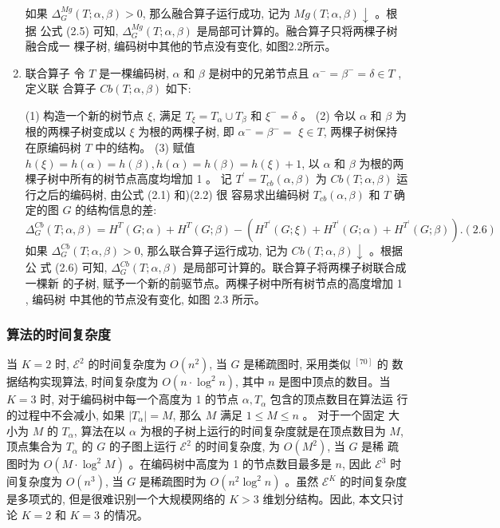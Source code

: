 \documentclass[a4paper]{apa6}
\begin{document}
\begin{enumerate}
如果 \(\Delta_{G}^{M g}(T ; \alpha, \beta)>0\), 那么融合算子运行成功, 记为 \(M g(T ; \alpha, \beta) \downarrow\) 。根据 公式 (2.5) 可知, \(\Delta_{G}^{M g}(T ; \alpha, \beta)\) 是局部可计算的。融合算子只将两棵子树融合成一 棵子树, 编码树中其他的节点没有变化, 如图2.2所示。

\item 联合算子
\label{sec:org2361be5}
令 \(T\) 是一棵编码树, \(\alpha\) 和 \(\beta\) 是树中的兄弟节点且 \(\alpha^{-}=\beta^{-}=\delta \in T\) , 定义联 合算子 \(C b(T ; \alpha, \beta)\) 如下:

(1) 构造一个新的树节点 \(\xi\), 满足 \(T_{\xi}=T_{\alpha} \cup T_{\beta}\) 和 \(\xi^{-}=\delta\) 。
(2) 令以 \(\alpha\) 和 \(\beta\) 为根的两棵子树变成以 \(\xi\) 为根的两棵子树, 即 \(\alpha^{-}=\beta^{-}=\) \(\xi \in T\), 两棵子树保持在原编码树 \(T\) 中的结构。
(3) 赋值 \(h(\xi)=h(\alpha)=h(\beta), h(\alpha)=h(\beta)=h(\xi)+1\), 以 \(\alpha\) 和 \(\beta\) 为根的两 棵子树中所有的树节点高度均增加 1 。
记 \(T^{\prime}=T_{c b}(\alpha, \beta)\) 为 \(C b(T ; \alpha, \beta)\) 运行之后的编码树, 由公式 (2.1) 和)(2.2) 很 容易求出编码树 \(T_{c b}(\alpha, \beta)\) 和 \(T\) 确定的图 \(G\) 的结构信息的差:
$$
\Delta_{G}^{C b}(T ; \alpha, \beta)=H^{T}(G ; \alpha)+H^{T}(G ; \beta)-\left(H^{T^{\prime}}(G ; \xi)+H^{T^{\prime}}(G ; \alpha)+H^{T^{\prime}}(G ; \beta)\right) .(2.6)
$$
如果 \(\Delta_{G}^{C b}(T ; \alpha, \beta)>0\), 那么联合算子运行成功, 记为 \(C b(T ; \alpha, \beta) \downarrow\) 。根据公 式 (2.6) 可知, \(\Delta_{G}^{C b}(T ; \alpha, \beta)\) 是局部可计算的。联合算子将两棵子树联合成一棵新 的子树, 赋予一个新的前驱节点。两棵子树中所有树节点的高度增加 1 , 编码树 中其他的节点没有变化, 如图 \(2.3\) 所示。
\end{enumerate}

\subsubsection{算法的时间复杂度}
\label{sec:orgca9a95a}
当 \(K=2\) 时, \(\mathcal{E}^{2}\) 的时间复杂度为 \(O\left(n^{2}\right)\), 当 \(G\) 是稀疏图时, 采用类似 \({ }^{[70]}\) 的 数据结构实现算法, 时间复杂度为 \(O\left(n \cdot \log ^{2} n\right)\), 其中 \(n\) 是图中顶点的数目。当 \(K=3\) 时, 对于编码树中每一个高度为 1 的节点 \(\alpha, T_{\alpha}\) 包含的顶点数目在算法运 行的过程中不会减小, 如果 \(\left|T_{\alpha}\right|=M\), 那么 \(M\) 满足 \(1 \leq M \leq n\) 。 对于一个固定 大小为 \(M\) 的 \(T_{\alpha}\), 算法在以 \(\alpha\) 为根的子树上运行的时间复杂度就是在顶点数目为 \(M\), 顶点集合为 \(T_{\alpha}\) 的 \(G\) 的子图上运行 \(\mathcal{E}^{2}\) 的时间复杂度, 为 \(O\left(M^{2}\right)\), 当 \(G\) 是稀 疏图时为 \(O\left(M \cdot \log ^{2} M\right)\) 。在编码树中高度为 1 的节点数目最多是 \(n\), 因此 \(\mathcal{E}^{3}\) 时 间复杂度为 \(O\left(n^{3}\right)\), 当 \(G\) 是稀疏图时为 \(O\left(n^{2} \log ^{2} n\right)\) 。虽然 \(\mathcal{E}^{K}\) 的时间复杂度是多项式的, 但是很难识别一个大规模网络的 \(K>3\) 维划分结构。因此, 本文只讨论 \(K=2\) 和 \(K=3\) 的情况。
\end{document}
